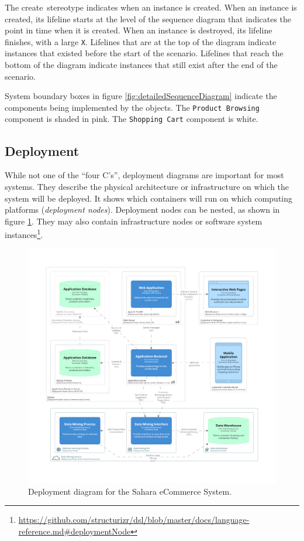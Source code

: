 The \guillemotleft create\guillemotright~stereotype indicates when an instance is created.
When an instance is created, its lifeline starts at the level of the sequence diagram that indicates the point in time when it is created.
When an instance is destroyed, its lifeline finishes, with a large \texttt{X}.
Lifelines that are at the top of the diagram indicate instances that existed before the start of the scenario.
Lifelines that reach the bottom of the diagram indicate instances that still exist after the end of the scenario.

System boundary boxes in figure \ref{fig:detailedSequenceDiagram} indicate the components being implemented by the objects.
The \texttt{Product Browsing} component is shaded in pink.
The \texttt{Shopping Cart} component is white.

\subsection{Deployment}\label{sec:c4_deployment}
While not one of the ``four C's'', deployment diagrams are important for most systems.
They describe the physical architecture or infrastructure on which the system will be deployed.
It shows which containers will run on which computing platforms (\emph{deployment nodes}).
Deployment nodes can be nested, as shown in figure \ref{fig:c4_deployment}.
They may also contain infrastructure nodes or software system instances\footnote{\url{https://github.com/structurizr/dsl/blob/master/docs/language-reference.md\#deploymentNode}}.

\begin{figure}[h!]
    \centering
    \begin{adjustwidth}{-7.5mm}{-7.5mm}
        \includegraphics[trim=195 235 195 198,clip,width=0.95\paperwidth]{images/c4/deployment_diagram.png}
    \end{adjustwidth}
    \caption{Deployment diagram for the Sahara eCommerce System.}
    \label{fig:c4_deployment}
\end{figure}

